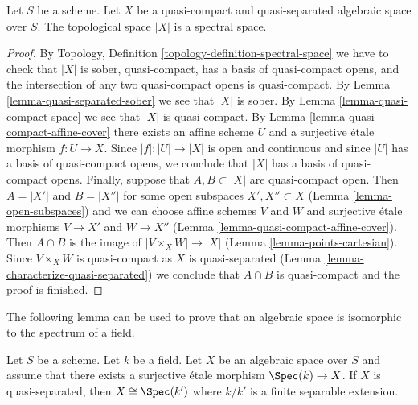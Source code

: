 \begin{lemma}
\label{lemma-quasi-compact-quasi-separated-spectral}
Let $S$ be a scheme. Let $X$ be a quasi-compact and quasi-separated
algebraic space over $S$. The topological space $|X|$ is a spectral space.
\end{lemma}

\begin{proof}
By Topology, Definition \ref{topology-definition-spectral-space}
we have to check that $|X|$ is sober, quasi-compact, has a basis
of quasi-compact opens, and the intersection of any two
quasi-compact opens is quasi-compact. By
Lemma \ref{lemma-quasi-separated-sober} we see that $|X|$ is sober.
By Lemma \ref{lemma-quasi-compact-space} we see that $|X|$ is quasi-compact.
By Lemma \ref{lemma-quasi-compact-affine-cover} there exists an affine scheme
$U$ and a surjective \'etale morphism $f : U \to X$.
Since $|f| : |U| \to |X|$ is open and continuous and since $|U|$ has
a basis of quasi-compact opens, we conclude that $|X|$ has a basis
of quasi-compact opens. Finally, suppose that
$A, B \subset |X|$ are quasi-compact open. Then $A = |X'|$ and $B = |X''|$
for some open subspaces $X', X'' \subset X$ (Lemma \ref{lemma-open-subspaces})
and we can choose affine schemes $V$ and $W$ and surjective
\'etale morphisms $V \to X'$ and $W \to X''$
(Lemma \ref{lemma-quasi-compact-affine-cover}).
Then $A \cap B$ is the image of
$|V \times_X W| \to |X|$ (Lemma \ref{lemma-points-cartesian}).
Since $V \times_X W$ is quasi-compact as $X$ is quasi-separated
(Lemma \ref{lemma-characterize-quasi-separated})
we conclude that $A \cap B$ is quasi-compact and the proof is finished.
\end{proof}

\noindent
The following lemma can be used to prove that
an algebraic space is isomorphic to the spectrum of a field.

\begin{lemma}
\label{lemma-point-like-spaces}
Let $S$ be a scheme. Let $k$ be a field.
Let $X$ be an algebraic space over $S$ and assume that there exists
a surjective \'etale morphism $\Spec(k) \to X$.
If $X$ is quasi-separated, then $X \cong \Spec(k')$
where $k/k'$ is a finite separable extension.
\end{lemma}

